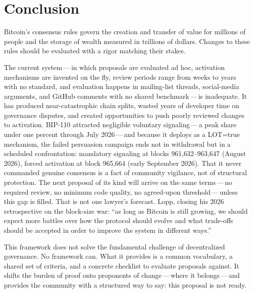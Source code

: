 \documentclass[11pt, twoside, openright]{book}
\begin{document}
\chapter{Conclusion}
\label{ch:conclusion}

Bitcoin's consensus rules govern the creation and transfer of value for millions of people and the storage of wealth measured in trillions of dollars. Changes to these rules should be evaluated with a rigor matching their stakes.

The current system\,---\,in which proposals are evaluated ad hoc, activation mechanisms are invented on the fly, review periods range from weeks to years with no standard, and evaluation happens in mailing-list threads, social-media arguments, and GitHub comments with no shared benchmark\,---\,is inadequate. It has produced near-catastrophic chain splits, wasted years of developer time on governance disputes, and created opportunities to push poorly reviewed changes to activation. BIP-110 attracted negligible voluntary signaling\,---\,a peak share under one percent through July 2026\,---\,and because it deploys as a LOT=true mechanism, the failed persuasion campaign ends not in withdrawal but in a scheduled confrontation: mandatory signaling at blocks 961{,}632--963{,}647 (August 2026), forced activation at block 965{,}664 (early September 2026). That it never commanded genuine consensus is a fact of community vigilance, not of structural protection. The next proposal of its kind will arrive on the same terms\,---\,no required review, no minimum code quality, no agreed-upon threshold\,---\,unless this gap is filled. That is not one lawyer's forecast. Lopp, closing his 2026 retrospective on the block-size war: ``as long as Bitcoin is still growing, we should expect more battles over how the protocol should evolve and what trade-offs should be accepted in order to improve the system in different ways.''

This framework does not solve the fundamental challenge of decentralized governance. No framework can. What it provides is a common vocabulary, a shared set of criteria, and a concrete checklist to evaluate proposals against. It shifts the burden of proof onto proponents of change\,---\,where it belongs\,---\,and provides the community with a structured way to say: this proposal is not ready.
\end{document}
